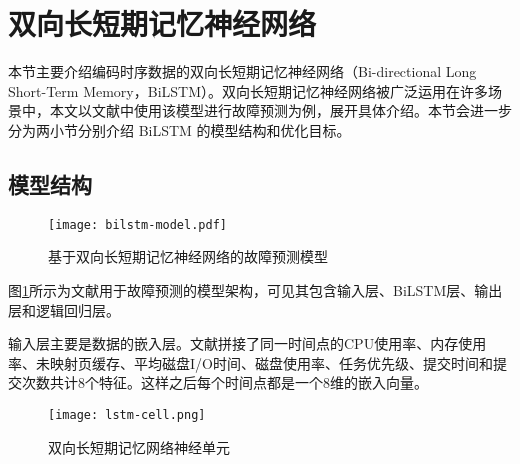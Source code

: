 \section{双向长短期记忆神经网络}\label{memory-net-section}
本节主要介绍编码时序数据的双向长短期记忆神经网络（Bi-directional Long Short-Term Memory，BiLSTM）。双向长短期记忆神经网络被广泛运用在许多场景中，本文以文献\parencite{gao2020task}中使用该模型进行故障预测为例，展开具体介绍。本节会进一步分为两小节分别介绍 BiLSTM 的模型结构和优化目标。
\subsection{模型结构}
\begin{figure}[htbp]
    \centering
    \texttt{[image: bilstm-model.pdf]}
    \caption{基于双向长短期记忆神经网络的故障预测模型\label{bilstm-model}}
\end{figure}
图\ref{bilstm-model}所示为文献\parencite{gao2020task}用于故障预测的模型架构，可见其包含输入层、BiLSTM层、输出层和逻辑回归层。

输入层主要是数据的嵌入层。文献\parencite{gao2020task}拼接了同一时间点的CPU使用率、内存使用率、未映射页缓存、平均磁盘I/O时间、磁盘使用率、任务优先级、提交时间和提交次数共计8个特征。这样之后每个时间点都是一个8维的嵌入向量。
\begin{figure}[htbp]
    \centering
    \texttt{[image: lstm-cell.png]}
    \caption{双向长短期记忆网络神经单元\label{lstm-cell}}
\end{figure}

